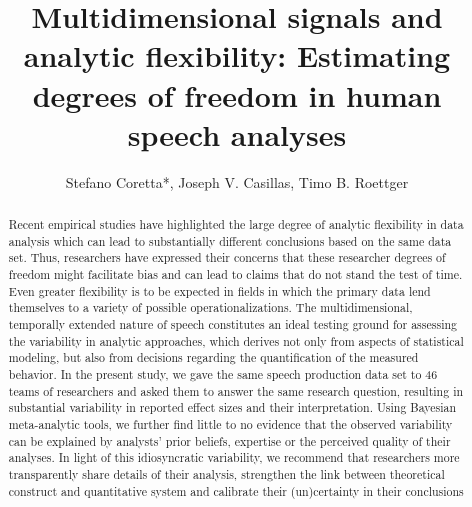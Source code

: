 \documentclass[Review,times,sageh]{sagej}
\begin{document}
\title{Multidimensional signals and analytic flexibility: Estimating degrees of freedom in human speech analyses}


\author{Stefano Coretta*, Joseph V. Casillas, Timo B. Roettger}




\begin{abstract}
Recent empirical studies have highlighted the large degree of analytic flexibility in data analysis which can lead to substantially different conclusions based on the same data set. Thus, researchers have expressed their concerns that these researcher degrees of freedom might facilitate bias and can lead to claims that do not stand the test of time. Even greater flexibility is to be expected in fields in which the primary data lend themselves to a variety of possible operationalizations. The multidimensional, temporally extended nature of speech constitutes an ideal testing ground for assessing the variability in analytic approaches, which derives not only from aspects of statistical modeling, but also from decisions regarding the quantification of the measured behavior. In the present study, we gave the same speech production data set to 46 teams of researchers and asked them to answer the same research question, resulting in substantial variability in reported effect sizes and their interpretation. Using Bayesian meta-analytic tools, we further find little to no evidence that the observed variability can be explained by analysts' prior beliefs, expertise or the perceived quality of their analyses. In light of this idiosyncratic variability, we recommend that researchers more transparently share details of their analysis, strengthen the link between theoretical construct and quantitative system and calibrate their (un)certainty in their conclusions
\end{abstract}
\end{document}
